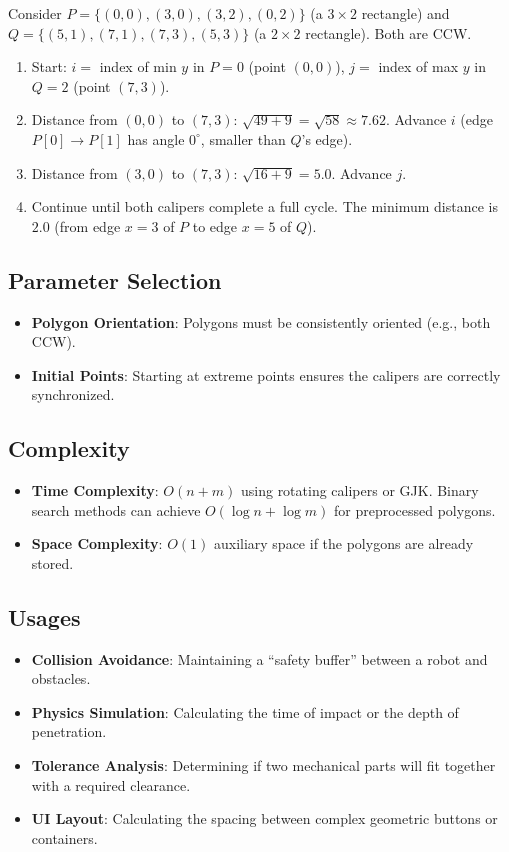 \begin{example}\label{ex:rotating_calipers}
Consider $P = \{(0,0), (3,0), (3,2), (0,2)\}$ (a $3 \times 2$ rectangle) and $Q = \{(5,1), (7,1), (7,3), (5,3)\}$ (a $2 \times 2$ rectangle). Both are CCW.
\begin{enumerate}
    \item Start: $i = $ index of min $y$ in $P = 0$ (point $(0,0)$), $j = $ index of max $y$ in $Q = 2$ (point $(7,3)$).
    \item Distance from $(0,0)$ to $(7,3)$: $\sqrt{49+9} = \sqrt{58} \approx 7.62$. Advance $i$ (edge $P[0] \to P[1]$ has angle $0^\circ$, smaller than $Q$'s edge).
    \item Distance from $(3,0)$ to $(7,3)$: $\sqrt{16+9} = 5.0$. Advance $j$.
    \item Continue until both calipers complete a full cycle. The minimum distance is $2.0$ (from edge $x=3$ of $P$ to edge $x=5$ of $Q$).
\end{enumerate}
\end{example}

\subsection{Parameter Selection}
\begin{itemize}
    \item \textbf{Polygon Orientation}: Polygons must be consistently oriented (e.g., both CCW).
    \item \textbf{Initial Points}: Starting at extreme points ensures the calipers are correctly synchronized.
\end{itemize}

\subsection{Complexity}
\begin{itemize}
    \item \textbf{Time Complexity}: $O(n + m)$ using rotating calipers or GJK. Binary search methods can achieve $O(\log n + \log m)$ for preprocessed polygons.
    \item \textbf{Space Complexity}: $O(1)$ auxiliary space if the polygons are already stored.
\end{itemize}

\subsection{Usages}
\begin{itemize}
    \item \textbf{Collision Avoidance}: Maintaining a ``safety buffer'' between a robot and obstacles.
    \item \textbf{Physics Simulation}: Calculating the time of impact or the depth of penetration.
    \item \textbf{Tolerance Analysis}: Determining if two mechanical parts will fit together with a required clearance.
    \item \textbf{UI Layout}: Calculating the spacing between complex geometric buttons or containers.
\end{itemize}

